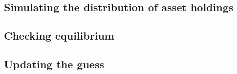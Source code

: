 \documentclass[12pt]{article}
\begin{document}
\subsection{Simulating the distribution of asset holdings}

\subsection{Checking equilibrium}

\subsection{Updating the guess}
\end{document}
